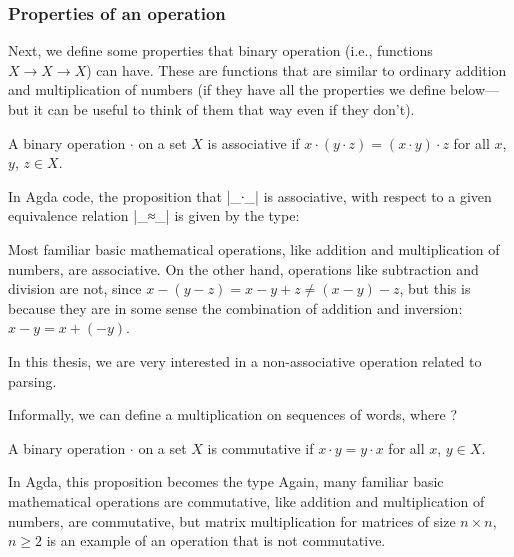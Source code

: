 

\subsubsection{Properties of an operation}
Next, we define some properties that binary operation (i.e., functions $X \to X \to X$) can have. These are functions that are similar to ordinary addition and multiplication of numbers (if they have all the properties we define below---but it can be useful to think of them that way even if they don't).
\begin{Definition} %
A binary operation $\cdot$ on a set $X$ is associative if $x \cdot (y \cdot z) = (x \cdot y) \cdot z$ for all $x$, $y$, $z \in X$.
\end{Definition}
In Agda code, the proposition that |_∙_| is associative, with respect to a given equivalence relation |_≈_| is given by the type:

Most familiar basic mathematical operations, like addition and multiplication of numbers, are associative. On the other hand, operations like subtraction and division are not, since $x - (y - z) = x - y + z \ne (x - y) - z$, but this is because they are in some sense the combination of addition and inversion: $x - y = x + (-y)$. %

In this thesis, we are very interested in a non-associative operation related to parsing.
\begin{Example}
Informally, we can define a multiplication on sequences of words, where ? 
\end{Example}
\begin{Definition} %
A binary operation $\cdot$ on a set $X$ is commutative if $x \cdot y = y \cdot x$ for all $x$, $y \in X$.
\end{Definition}
In Agda, this proposition becomes the type
Again, many familiar basic mathematical operations are commutative, like addition and multiplication of numbers, are commutative, but matrix multiplication for matrices of size $n \times n$, $n \ge 2$ is an example of an operation that is not commutative.

